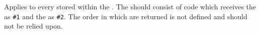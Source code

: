 \documentclass[oneside]{book}
\begin{document}

\begin{function}{\PropVarMapInline}
\begin{syntax}
  
\end{syntax}
Applies  to every  stored
within the . The  should
consist of code which receives the  as \verb|#1| and the
 as \verb|#2|.
The order in which  are returned is not defined and
should not be relied upon.
\begin{demohigh}
\IgnoreSpacesOn
\PropSetFromKeyval {}
\TlClear \lTmpaTl
\PropVarMapInline {}
\TlUse \lTmpaTl
\IgnoreSpacesOff
\end{demohigh}
\end{function}

\end{document}
